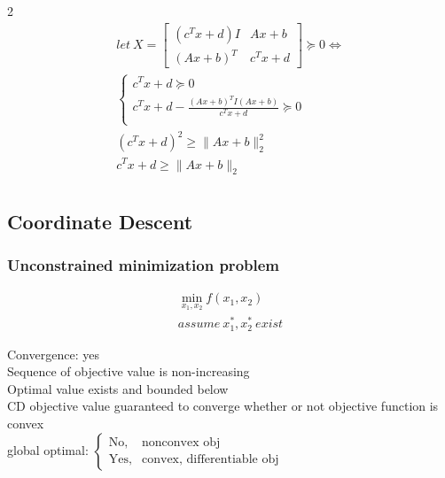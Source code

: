 \documentclass[8pt]{extarticle}
\newcommand{\norm}[1]{\|#1\|}
\begin{document}
\begin{multicols*}{2}
  \begin{align*}
    let\ X=
    \begin{bmatrix}
      (c^Tx+d)I & Ax+b\\
      (Ax+b)^T & c^Tx+d
    \end{bmatrix} \succeq 0 \iff\\
    \begin{cases}
      c^Tx+d \succeq 0 & \\
      c^Tx+d - \frac{(Ax+b)^TI(Ax+b)}{c^Tx+d} \succeq 0 &\\      
    \end{cases}\\
    (c^Tx+d)^2 \geq \norm{Ax+b}_2^2\\
    c^Tx+d \geq \norm{Ax+b}_2\\
  \end{align*}
  
  \vfill\null
  \columnbreak

  \subsection{Coordinate Descent}
  \subsubsection{Unconstrained minimization problem}
  \begin{align*}
    \min_{x_1,x_2} f(x_1,x_2)\\
    assume\ x_1^*, x_2^*\ exist
  \end{align*}
  \begin{algorithm}[H]
    \caption{Coordinate Descent\label{algo:CoordDescent}}
  \end{algorithm}
  Convergence: yes\\
  Sequence of objective value is non-increasing\\
  Optimal value exists and bounded below\\
  CD objective value guaranteed to converge whether or not objective function is convex\\
  global optimal: $
  \begin{cases}
    \text{No} , & \text{nonconvex obj}\\
    \text{Yes} , & \text{convex, differentiable obj}
  \end{cases}
  $\\


\end{multicols*}
\end{document}
